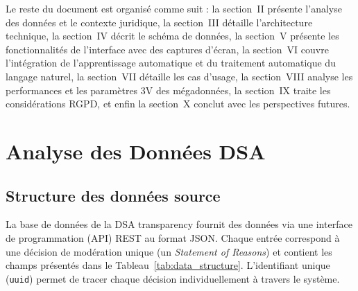 \documentclass[10pt,twocolumn,a4paper]{article}
\begin{document}
Le reste du document est organisé comme suit : la section~II présente l'analyse des données et le contexte juridique, la section~III détaille l'architecture technique, la section~IV décrit le schéma de données, la section~V présente les fonctionnalités de l'interface avec des captures d'écran, la section~VI couvre l'intégration de l'apprentissage automatique et du traitement automatique du langage naturel, la section~VII détaille les cas d'usage, la section~VIII analyse les performances et les paramètres 3V des mégadonnées, la section~IX traite les considérations RGPD, et enfin la section~X conclut avec les perspectives futures.


\section{Analyse des Données DSA}

\subsection{Structure des données source}

La base de données de la DSA transparency fournit des données via une interface de programmation (API) REST au format JSON. Chaque entrée correspond à une décision de modération unique (un \textit{Statement of Reasons}) et contient les champs présentés dans le Tableau~\ref{tab:data_structure}. L'identifiant unique (\texttt{uuid}) permet de tracer chaque décision individuellement à travers le système.
\end{document}
